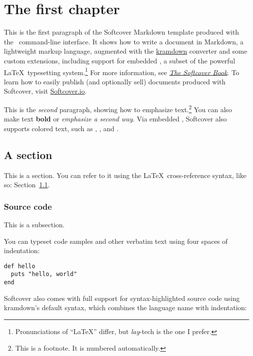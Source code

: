 \chapter{The first chapter}
\label{cha:a_chapter}

This is the first paragraph of the Softcover Markdown template produced with the \softcover\ command-line interface. It shows how to write a document in Markdown, a lightweight markup language, augmented with the \href{http://kramdown.gettalong.org/}{kramdown} converter and some custom extensions, including support for embedded \PolyTeX, a subset of the powerful \LaTeX\ typesetting system.\footnote{Pronunciations of {}``LaTeX{}'' differ, but \emph{lay}-tech is the one I prefer.} For more information, see \href{http://manual.softcover.io/book}{\emph{The Softcover Book}}. To learn how to easily publish (and optionally sell) documents produced with Softcover, visit \href{http://softcover.io/}{Softcover.io}.

This is the \emph{second} paragraph, showing how to emphasize text.\footnote{This is a footnote. It is numbered automatically.} You can also make text \textbf{bold} or \emph{emphasize a second way}. Via embedded \PolyTeX, Softcover also supports colored text, such as , , and .

\section{A section}

\label{sec:a_section}

This is a section. You can refer to it using the \LaTeX\ cross-reference syntax, like so: Section~\ref{sec:a_section}.

\subsection{Source code}

This is a subsection.

You can typeset code samples and other verbatim text using four spaces of indentation:

\begin{verbatim}
def hello
  puts "hello, world"
end
\end{verbatim}

Softcover also comes with full support for syntax-highlighted source code using kramdown{}'s default syntax, which combines the language name with indentation:

